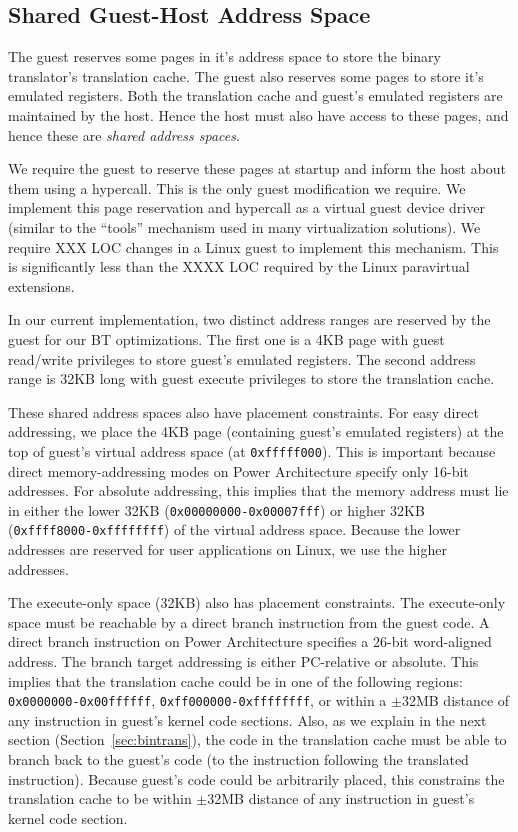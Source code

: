 \documentclass[10pt,twocolumn]{article}
\begin{document}
\subsection{Shared Guest-Host Address Space}
\label{sec:sharedspace}
The guest reserves some pages in it's address space to store the
binary translator's translation
cache. The guest also reserves some pages to store it's emulated registers.
Both the translation cache and guest's emulated registers are maintained by
the host. Hence the host must also have access to these pages, and hence these
are {\em shared address spaces}.

We require the guest to reserve these pages at startup and inform the host about
them using a hypercall.
This is the only guest modification we require.
We implement this page reservation
and hypercall as a virtual guest device driver (similar to the ``tools'' mechanism
used in many virtualization solutions).
We require XXX LOC changes in a Linux guest to implement this mechanism. This is
significantly less than the XXXX LOC required by the Linux paravirtual
extensions.

In our current implementation, two distinct address ranges are reserved by the
guest for our BT optimizations.
The first one is a 4KB page with guest read/write privileges
to store guest's emulated registers.  The second address range is 32KB long
with guest execute privileges to store the translation cache.

These shared address spaces also have placement constraints. For easy direct
addressing, we place the 4KB page (containing guest's emulated registers) at
the top of guest's virtual address space (at {\tt 0xfffff000}). This is important 
because direct memory-addressing modes on Power Architecture specify only 16-bit
addresses. For absolute addressing, this implies that the memory
address must lie in either
the lower 32KB ({\tt 0x00000000-0x00007fff}) or higher
32KB ({\tt 0xffff8000-0xffffffff}) of the virtual address space. Because the lower
addresses are reserved for user applications on Linux, we use the higher addresses.

The execute-only space (32KB) also has placement
constraints. The execute-only space must be reachable
by a direct branch instruction from the guest code. A direct branch instruction
on Power Architecture specifies a 26-bit
word-aligned address. The branch target addressing is either PC-relative
or absolute. This implies that the translation cache could be
in one of the following regions: {\tt 0x0000000-0x00ffffff}, {\tt 0xff000000-0xffffffff},
or within a $\pm$32MB distance of any instruction in guest's kernel code sections.
Also, as we explain in the
next section (Section~\ref{sec:bintrans}), the code in the translation cache must
be able to branch
back to the guest's code (to the instruction following the translated instruction).
Because guest's code could be arbitrarily placed, this constrains the translation
cache to be within $\pm$32MB distance of any instruction in
guest's kernel code section.
\end{document}
